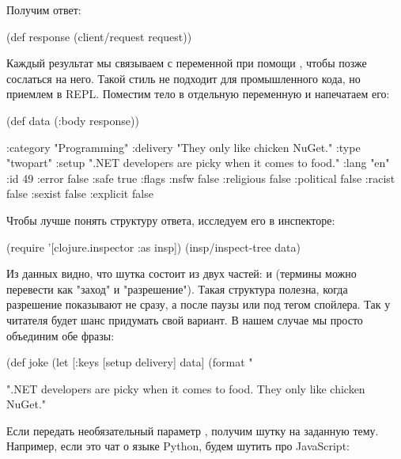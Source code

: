 Получим ответ:

\begin{english}
  \begin{clojure}
(def response
  (client/request request))
  \end{clojure}
\end{english}

Каждый результат мы связываем с переменной при помощи , чтобы позже сослаться на него. Такой стиль не подходит для промышленного кода, но приемлем в REPL. Поместим тело в отдельную переменную и напечатаем его:

\begin{english}
  \begin{clojure}
(def data
  (:body response))

{:category "Programming"
 :delivery "They only like chicken NuGet."
 :type "twopart"
 :setup ".NET developers are picky when it comes to food."
 :lang "en"
 :id 49
 :error false
 :safe true
 :flags
 {:nsfw false
  :religious false
  :political false
  :racist false
  :sexist false
  :explicit false}}
  \end{clojure}
\end{english}

Чтобы лучше понять структуру ответа, исследуем его в инспекторе:

\begin{english}
  \begin{clojure}
(require '[clojure.inspector :as insp])
(insp/inspect-tree data)
  \end{clojure}
\end{english}

Из данных видно, что шутка состоит из двух частей:  и  (термины можно перевести как "заход" и "разрешение"). Такая структура полезна, когда разрешение показывают не сразу, а после паузы или под тегом спойлера. Так у читателя будет шанс придумать свой вариант. В нашем случае мы просто объединим обе фразы:

\begin{english}
  \begin{clojure}
(def joke
  (let [{:keys [setup
                delivery]} data]
    (format "%

".NET developers are picky when it comes to food. They only like chicken NuGet."
  \end{clojure}
\end{english}

Если передать необязательный параметр , получим шутку на заданную тему. Например, если это чат о языке Python, будем шутить про JavaScript:


